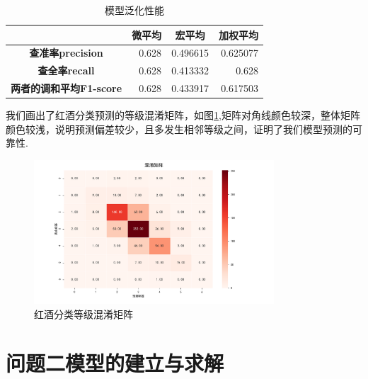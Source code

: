 \documentclass{whutmod}
\begin{document}
\begin{table}[!htbp]
	\centering
	\caption{模型泛化性能}
	\begin{tabular}{crrr}
		\toprule
		& \multicolumn{1}{c}{\textbf{微平均}} & \multicolumn{1}{c}{\textbf{宏平均}} & \multicolumn{1}{c}{\textbf{加权平均}} \\
		\midrule
		\textbf{查准率precision} & 0.628 & 0.496615 & 0.625077 \\
		\textbf{查全率recall} & 0.628 & 0.413332 & 0.628 \\
		\textbf{两者的调和平均F1-score} & 0.628 & 0.433917 & 0.617503 \\
		\bottomrule
	\end{tabular}%
	\label{tab:addlabel}%
\end{table}%
我们画出了红酒分类预测的等级混淆矩阵，如图\ref{cm1},矩阵对角线颜色较深，整体矩阵颜色较浅，说明预测偏差较少，且多发生相邻等级之间，证明了我们模型预测的可靠性.
\begin{figure}[!h]
	\centering
	\includegraphics[width=0.8\textwidth]{cm1.pdf}
	\caption{红酒分类等级混淆矩阵}
\label{cm1}
\end{figure}

\section{问题二模型的建立与求解}
\end{document}

